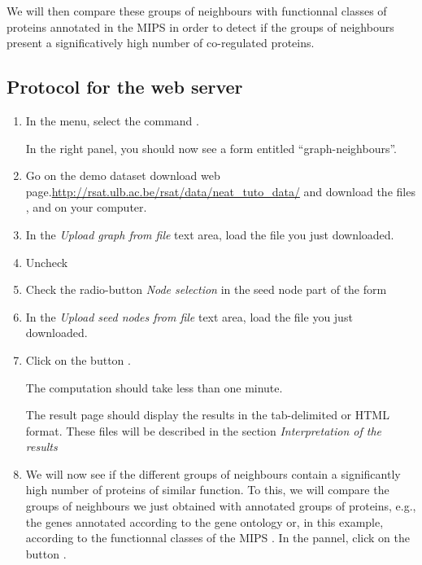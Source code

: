 We will then compare these groups of neighbours with functionnal classes of proteins annotated in the MIPS \cite{Mewes2007} in order to detect if the groups of neighbours present a significatively high number of co-regulated proteins.



\subsection{Protocol for the web server}

\begin{enumerate}

\item In the \neat menu, select the command . 

  In the right panel, you should now see a form entitled
  ``graph-neighbours''.

\item Go on the demo dataset download web page.\url{http://rsat.ulb.ac.be/rsat/data/neat\_tuto\_data/} and download the files ,  and  on your computer.

\item In the \textit{Upload graph from file} text area, load the file  you just downloaded.
\item Uncheck 
\item Check the radio-button \textit{Node selection} in the seed node part of the form
\item In the \textit{Upload seed nodes from file} text area, load the file  you just downloaded.
\item Click on the button . 

  The computation should take less than one minute.
  
  The result page should display the results in the tab-delimited or HTML format. These files will be described in the section \textit{Interpretation of the results}

\item We will now see if the different groups of neighbours contain a significantly high number of proteins of similar
function. To this, we will compare the groups of neighbours we just obtained with annotated groups of proteins, e.g., the genes annotated according to the gene ontology \cite{GO2007} or, in this example, according to the functionnal classes of the MIPS \cite{Mewes2007}. In the  pannel, click on the button . 


\end{enumerate}
